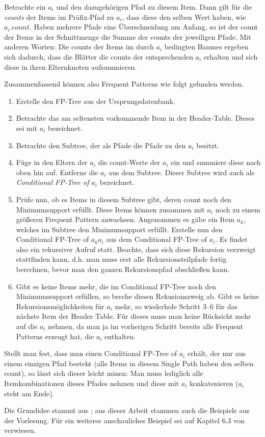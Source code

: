 Betrachte ein \(a_i\) und den dazugehörigen Pfad zu diesem Item. Dann gilt
für die \textit{counts} der Items im Präfix-Pfad zu \(a_i\), dass diese den selben
Wert haben, wie \(a_i.count\). Haben mehrere Pfade eine Überschneidung am  Anfang,
so ist der count der Items in der Schnittmenge die Summe der counts der jeweiligen Pfade.
Mit anderen Worten: Die counts der Items im durch \(a_i\) bedingten Baumes ergeben 
sich dadurch, dass die Blätter die counts der entsprechenden \(a_i\) erhalten und sich
diese in ihren Elternknoten aufsummieren.

Zusammenfassend können also Frequent Patterns wie folgt gefunden werden.
\begin{enumerate}
  \item Erstelle den FP-Tree aus der Ursprungsdatenbank.
  \item Betrachte das am seltensten vorkommende Item in der Header-Table.
  Dieses sei mit \(a_i\) bezeichnet.
  \item Betrachte den Subtree, der als Pfade die Pfade zu den \(a_i\) besitzt.
  \item Füge in den Eltern der \(a_i\) die count-Werte der \(a_i\) ein und 
  summiere diese nach oben hin auf. Entferne die \(a_i\) aus dem Subtree.
  Dieser Subtree wird auch als \textit{Conditional FP-Tree of \(a_i\)} bezeichnet.
  \item Prüfe nun, ob es Items in diesem Subtree gibt, deren count noch den
  Minimumsupport erfüllt. Diese Items können zusammen mit \(a_i\) noch zu einem
  größeren Frequent Pattern anwachsen. Angenommen es gäbe ein Item \(a_k\),
  welches im Subtree den Minimumsupport erfüllt. Erstelle nun den Conditional
  FP-Tree of \(a_k a_i\) aus dem Conditional FP-Tree of \(a_i\). Es findet also ein
  rekursiver Aufruf statt. Beachte, dass sich diese Rekursion verzweigt stattfinden kann,
  d.h. man muss erst alle Rekursionsteilpfade fertig berechnen, bevor man den ganzen
  Rekursionspfad abschließen kann.
  \item Gibt es keine Items mehr, die im Conditional FP-Tree noch den Minimumssupport
  erfüllen, so breche diesen Rekusionszweig ab. Gibt es keine Rekursionsmöglichkeiten für
  \(a_i\) mehr, so wiederhole Schritt 3--6 für das nächste Item der Header Table.
  Für dieses muss man
  keine Rücksicht mehr auf die \(a_i\) nehmen, da man ja im vorherigen Schritt bereits alle 
  Frequent Patterns erzeugt hat, die \(a_i\) enthalten.
\end{enumerate}

Stellt man fest, dass man einen Conditional FP-Tree of \(a_i\) erhält, der nur aus einem 
einzigen Pfad
besteht (alle Items in diesem Single Path haben den selben count), so lässt sich dieser leicht
minen: Man muss lediglich alle Itemkombinationen dieses Pfades nehmen und diese mit 
\(a_i\) konkatenieren (\(a_i\) steht am Ende). 

Die Grundidee stammt aus \citet{Han00}; aus dieser Arbeit stammen auch die Beispiele
aus der Vorlesung. Für ein weiteres anschauliches Beispiel sei auf Kapitel 6.3 von \citet{Witten11}
verwiesen.
